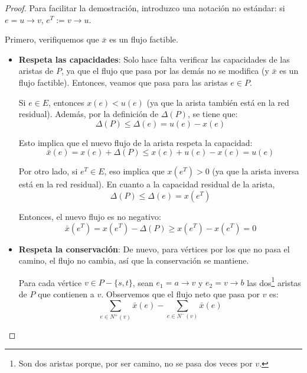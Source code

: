 \documentclass[a4paper]{report}
\begin{document}
\begin{proof}
    Para facilitar la demostración, introduzco una notación no estándar: si $e = u \rightarrow v$, $e^T := v \rightarrow u$.

    Primero, verifiquemos que $\bar{x}$ es un flujo factible.
    \begin{itemize}
        \item \textbf{Respeta las capacidades}: Solo hace falta verificar las capacidades de las aristas de $P$, ya que el flujo que pasa por las demás no se modifica (y $\bar{x}$ es un flujo factible). Entonces, veamos que pasa para las aristas $e \in P$.

              Si $e \in E$, entonces $x(e) < u(e)$ (ya que la arista también está en la red residual). Además, por la definición de $\Delta(P)$, se tiene que:
              $$\Delta(P) \leq \Delta(e) = u(e) - x(e)$$

              Esto implica que el nuevo flujo de la arista respeta la capacidad:
              $$\bar{x}(e) = x(e) + \Delta(P) \leq x(e) + u(e) - x(e) = u(e)$$

              Por otro lado, si $e^T \in E$, eso implica que $x(e^T) > 0$ (ya que la arista inversa está en la red residual). En cuanto a la capacidad residual de la arista,
              $$\Delta(P) \leq \Delta(e) = x(e^T)$$

              Entonces, el nuevo flujo es no negativo:
              $$\bar{x}(e^T) = x(e^T) - \Delta(P) \geq x(e^T) - x(e^T) = 0$$

        \item \textbf{Respeta la conservación}: De nuevo, para vértices por los que no pasa el camino, el flujo no cambia, así que la conservación se mantiene.

              Para cada vértice $v \in P - \{s, t\}$, sean $e_1 = a \rightarrow v$ y $e_2 = v \rightarrow b$ las dos\footnote{Son dos aristas porque, por ser camino, no se pasa dos veces por $v$.} aristas de $P$ que contienen a $v$. Observemos que el flujo neto que pasa por $v$ es:
              $$\sum_{e \in N^+(v)} \bar{x}(e) - \sum_{e \in N^-(v)} \bar{x}(e)$$


\end{itemize}
\end{proof}
\end{document}
